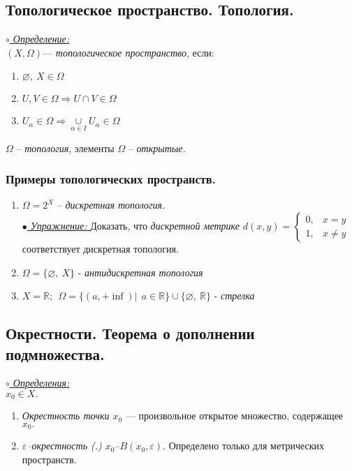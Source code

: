\documentclass[10pt]{report}
\begin{document}
\begin{spacing}{1.5}
\subsection{Топологическое пространство. Топология.}
 \underline{\textit{$\circ$ Определение:}}\\
 $(X, \Omega)$--- \emph{топологическое пространство}, если:
 \begin{enumerate}
 \item $\varnothing,~X\in \Omega$
 \item $U, V\in \Omega \Rightarrow U\cap V\in \Omega$
 \item $U_{\alpha}\in \Omega \Rightarrow \underset{\alpha\in I}{\cup}U_{\alpha}\in \Omega$
 
 \end{enumerate}
  $\Omega$ -- \emph{топология}, элементы $\Omega$ -- \emph{открытые.}
\subsubsection{Примеры топологических пространств.}
\begin{enumerate}
\item $\Omega=2^{X}$ -- \emph{дискретная топология.}\\
\underline{\emph{$\bullet$ Упражнение: }} Доказать, что \emph{дискретной метрике} $d(x, y) = \begin{cases}
  0,  &  x=y  \\
  1, &  x\neq y 
\end{cases}$ соответствует дискретная топология.
\item $\Omega=\lbrace\varnothing,~X\rbrace$ - \emph{антидискретная топология}
\item $X=\mathbb{R};~~ \Omega=\lbrace (a, +\inf)|~~a\in \mathbb{R} \rbrace\cup\lbrace\varnothing,~ \mathbb{R}\rbrace $ - \emph{стрелка}
\end{enumerate}
\subsection{Окрестности. Теорема о дополнении подмножества.}
\underline{\textit{$\circ$ Определения:}}\\
$x_{0}\in X.$
\begin{enumerate}
\item \emph{Окрестность точки $x_{0}$} --- произвольное открытое множество, содержащее $x_{0}.$
\item \emph{$\varepsilon$--окрестность (.) $x_{0}$}--$B(x_{0},\varepsilon).$ Определено только для метрических пространств.
\end{enumerate}

\end{spacing}
\end{document}
